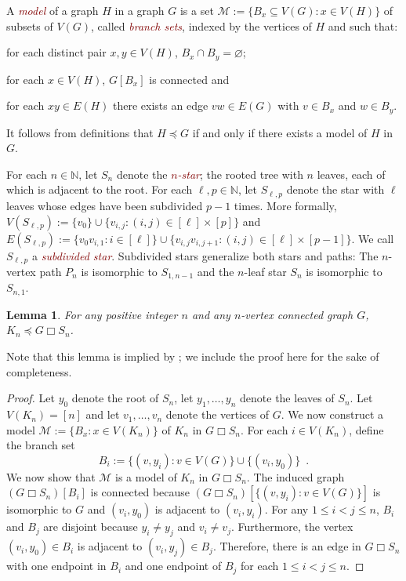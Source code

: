\documentclass{patmorin}
\newcommand{\defn}[1]{\textcolor{Maroon}{\emph{#1}}}
\newcommand{\boxprod}{\mathbin{\Box}}
\newcommand{\N}{\mathbb{N}}
\renewcommand{\emptyset}{\varnothing}
\renewcommand{\le}{\leqslant}
\theoremstyle{plain}
\newtheorem{lem}[thm]{Lemma}
\theoremstyle{definition}
\begin{document}
A \defn{model} of a graph $H$ in a graph $G$ is a set $\mathcal{M}:=\{B_x\subseteq V(G): x\in V(H)\}$ of subsets of $V(G)$, called \defn{branch sets}, indexed by the vertices of $H$ and such that:
\begin{compactenum}[(i)]
  \item for each distinct pair $x,y\in V(H)$, $B_x\cap B_y=\emptyset$;
  \item for each $x\in V(H)$, $G[B_x]$ is connected and
  \item for each $xy\in E(H)$ there exists an edge $vw\in E(G)$ with $v\in B_x$ and $w\in B_y$.
\end{compactenum}
It follows from definitions that $H\preceq G$ if and only if there exists a model of $H$ in $G$.

For each $n\in \N$, let $S_n$ denote the \defn{$n$-star}; the rooted tree with $n$ leaves, each of which is adjacent to the root.  For each $\ell,p\in\N$, let $S_{\ell,p}$ denote the star with $\ell$ leaves whose edges have been subdivided $p-1$ times.  More formally, $V(S_{\ell,p}):=\{v_0\}\cup\{v_{i,j}:(i,j)\in[\ell]\times[p]\}$ and $E(S_{\ell,p}):=\{v_0v_{i,1}:i\in[\ell]\}\cup \{v_{i,j}v_{i,j+1}:(i,j)\in[\ell]\times[p-1]\}$.  We call $S_{\ell,p}$ a \defn{subdivided star}.  Subdivided stars generalize both stars and paths: The $n$-vertex path $P_n$ is isomorphic to $S_{1,n-1}$ and the $n$-leaf star $S_n$ is isomorphic to $S_{n,1}$. 

\begin{lem}\label{anything_times_star}
  For any positive integer $n$ and any $n$-vertex connected graph $G$, $K_{n} \preceq G\boxprod S_n$.
\end{lem}

Note that this lemma is implied by \citep[Lemma~5.1]{Wood-NYJM11}; we include the proof here for the sake of completeness.
\begin{proof}
  Let $y_0$ denote the root of $S_n$, let $y_1,\ldots,y_n$ denote the leaves of $S_n$.  Let $V(K_{n})=[n]$ and let $v_1,\ldots,v_n$ denote the vertices of $G$.  
  We now construct a model $\mathcal{M}:=\{B_x:x\in V(K_n)\}$ of $K_n$ in $G\boxprod S_n$.  For each $i\in V(K_n)$, define the branch set
  \[
     B_i:=\{(v,y_i):v\in V(G)\} \cup \{ (v_{i},y_0) \} \enspace .
  \]
  We now show that $\mathcal{M}$ is a model of $K_n$ in $G\boxprod S_n$.
  The induced graph $(G\boxprod S_n)[B_i]$ is connected because $(G\boxprod S_n)[\{(v,y_i):v\in V(G)\}]$ 
  is isomorphic to $G$ and $(v_{i},y_0)$ is adjacent to $(v_{i},y_i)$.
  For any $1\le i< j\le n$, $B_i$ and $B_j$ are disjoint because $y_i\neq y_j$ and $v_i\neq v_j$.  Furthermore, the vertex $(v_{i},y_0)\in B_i$ is adjacent to $(v_i,y_j)\in B_j$.  Therefore, there is an edge in $G\boxprod S_n$ with one endpoint in $B_i$ and one endpoint of $B_j$ for each $1\le i < j\le n$.
\end{proof}
\end{document}
